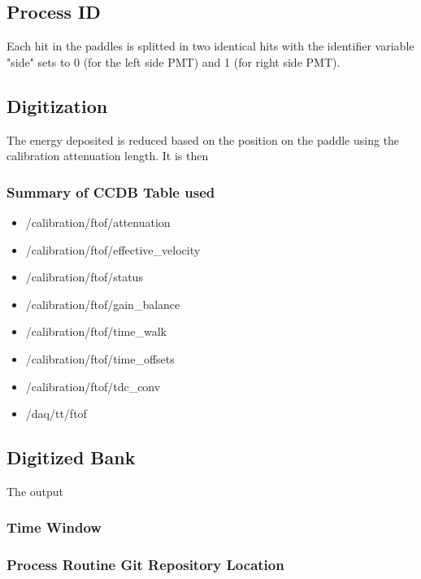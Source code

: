 \subsection{Process ID}
Each hit in the paddles is splitted in two identical hits with the identifier variable "side" sets to 0 (for the left side PMT) and 1 (for right side PMT).

\subsection{Digitization}

The energy deposited is reduced based on the position on the paddle using the calibration attenuation length. It is then

\subsubsection{Summary of CCDB Table used}
\begin{itemize}
	\item /calibration/ftof/attenuation
	\item /calibration/ftof/effective\_velocity
	\item /calibration/ftof/status
	\item /calibration/ftof/gain\_balance
	\item /calibration/ftof/time\_walk
	\item /calibration/ftof/time\_offsets
	\item /calibration/ftof/tdc\_conv
	\item /daq/tt/ftof
\end{itemize}

\subsection{Digitized Bank}
The output



\subsubsection{Time Window}

\subsubsection{Process Routine Git Repository Location}


